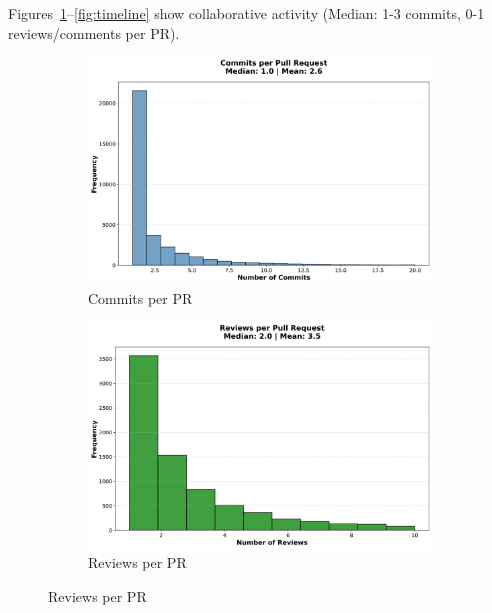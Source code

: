 \documentclass[11pt]{article}
\begin{document}
Figures~\ref{fig:commits}--\ref{fig:timeline} show collaborative activity (Median: 1-3 commits, 0-1 reviews/comments per PR).

\begin{figure}[H]
\centering
\begin{subfigure}[b]{0.48\textwidth}
\centering
\includegraphics[width=\textwidth]{figures_individual/10_commits_per_pr_histogram.png}
\caption{Commits per PR}
\label{fig:commits}
\end{subfigure}
\hfill
\begin{subfigure}[b]{0.48\textwidth}
\centering
\includegraphics[width=\textwidth]{figures_individual/13_reviews_per_pr_histogram.png}
\caption{Reviews per PR}
\label{fig:reviews}
\end{subfigure}

\vspace{0.3cm}


\end{figure}
\end{document}
